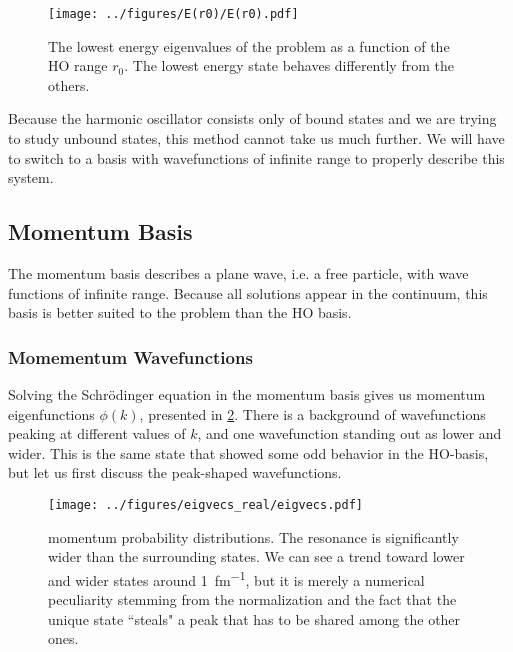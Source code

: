 \documentclass[../main/report.tex]{subfiles}
\begin{document}

\begin{figure}[hb]
  \centering
 	\texttt{[image: ../figures/E(r0)/E(r0).pdf]}
  \caption{The lowest energy eigenvalues of the  problem as a function of the HO range $r_0$. The lowest energy state behaves differently from the others.}
  \label{fig:energies(r0)}
\end{figure}


Because the harmonic oscillator consists only of bound states and we are trying to study unbound states, this method cannot take us much further.
We will have to switch to a basis with wavefunctions of infinite range to properly describe this system.

\subsection{Momentum Basis}
\label{sub:momentum_basis}

The momentum basis describes a plane wave, i.e. a free particle, with wave functions of infinite range.
Because all  solutions appear in the continuum, this basis is better suited to the problem than the HO basis.

\subsubsection{Momementum Wavefunctions}

Solving the Schrödinger equation in the momentum basis gives us momentum eigenfunctions $\phi(k)$, presented in \cref{fig:real_momentum_wavefunctions}.
There is a background of wavefunctions peaking at different values of $k$, and one wavefunction standing out as lower and wider.
This is the same state that showed some odd behavior in the HO-basis, but let us first discuss the peak-shaped wavefunctions.


\begin{figure}[h]
  \centering
  	\texttt{[image: ../figures/eigvecs\_real/eigvecs.pdf]}

  \caption{ momentum probability distributions. The resonance is significantly wider than the surrounding states. We can see a trend toward lower and wider states around \SI{1}{fm^{-1}}, but it is merely a numerical peculiarity stemming from the normalization and the fact that the unique state ``steals" a peak that has to be shared among the other ones.} 
  \label{fig:real_momentum_wavefunctions}
\end{figure}
\end{document}
